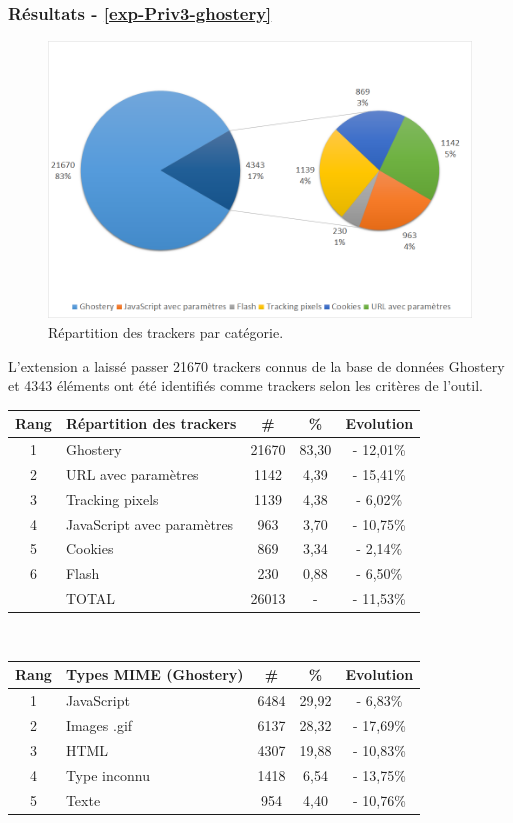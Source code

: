\subsubsection{Résultats - \autoref{exp-Priv3-ghostery}}
\begin{figure}[!h]
	\centering
	\includegraphics[scale=.6]{resultats/ANALYSES/Images/Priv3-Ghostery.png}
	\caption{\label{exp-Priv3-ghostery}Répartition des trackers par catégorie.}
\end{figure}

L'extension a laissé passer 21670 trackers connus de la base de données Ghostery et 4343 éléments ont été identifiés comme trackers selon les critères de l'outil.\\

\begin{tabular}{ c | p{5cm} | c | c || c | }
   Rang & Répartition des trackers & \# & \% & Evolution \\
   \hline
   \hline
   1 & Ghostery & 21670 & 83,30 & - 12,01\% \\
   2 & URL avec paramètres & 1142 & 4,39 & - 15,41\% \\
   3 & Tracking pixels & 1139 & 4,38 & - 6,02\% \\
   4 & JavaScript avec paramètres & 963 & 3,70 & - 10,75\% \\
   5 & Cookies & 869 & 3,34 & - 2,14\% \\
   6 & Flash & 230 & 0,88 & - 6,50\% \\
   \hline
    & TOTAL & 26013 & - & - 11,53\%\\
   \hline
\end{tabular}
\\[1cm]

\begin{tabular}{ c | p{5cm} | c | c | c | }
   Rang & Types MIME (Ghostery) & \# & \% & Evolution\\
   \hline
   \hline
   1 & JavaScript & 6484 & 29,92 & - 6,83\% \\
   2 & Images .gif & 6137 & 28,32 & - 17,69\% \\
   3 & HTML & 4307 & 19,88 & - 10,83\% \\
   4 & Type inconnu & 1418 & 6,54 & - 13,75\% \\
   5 & Texte & 954 & 4,40 & - 10,76\% \\
   \hline
\end{tabular}
\\[.3cm]

